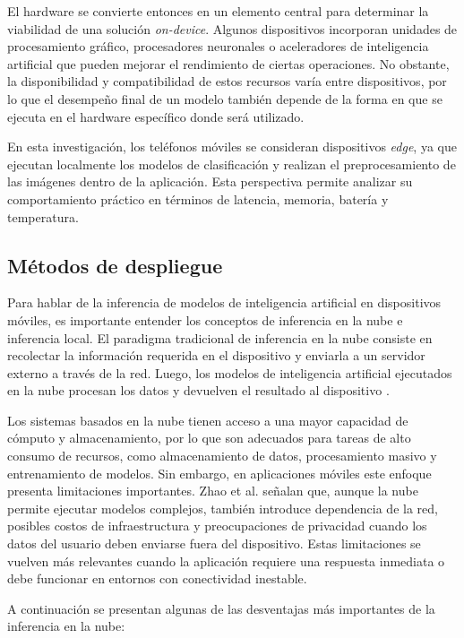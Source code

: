 El hardware se convierte entonces en un elemento central para determinar la viabilidad de una solución \textit{on-device}. Algunos
dispositivos incorporan unidades de procesamiento gráfico, procesadores neuronales o aceleradores de inteligencia artificial que pueden
mejorar el rendimiento de ciertas operaciones. No obstante, la disponibilidad y compatibilidad de estos recursos varía entre dispositivos,
por lo que el desempeño final de un modelo también depende de la forma en que se ejecuta en el hardware específico donde será utilizado.

En esta investigación, los teléfonos móviles se consideran dispositivos \textit{edge}, ya que ejecutan localmente los modelos de
clasificación y realizan el preprocesamiento de las imágenes dentro de la aplicación. Esta perspectiva permite analizar su comportamiento
práctico en términos de latencia, memoria, batería y temperatura.

\subsection{Métodos de despliegue}

Para hablar de la inferencia de modelos de inteligencia artificial en dispositivos móviles, es importante entender los conceptos de
inferencia en la nube e inferencia local. El paradigma tradicional de inferencia en la nube consiste en recolectar la información requerida
en el dispositivo y enviarla a un servidor externo a través de la red. Luego, los modelos de inteligencia artificial ejecutados en la nube
procesan los datos y devuelven el resultado al dispositivo \cite{li2025empirical}.

Los sistemas basados en la nube tienen acceso a una mayor capacidad de cómputo y almacenamiento, por lo que son adecuados para tareas de
alto consumo de recursos, como almacenamiento de datos, procesamiento masivo y entrenamiento de modelos. Sin embargo, en aplicaciones
móviles este enfoque presenta limitaciones importantes. Zhao et al. \cite{zhao2022survey} señalan que, aunque la nube permite ejecutar
modelos complejos, también introduce dependencia de la red, posibles costos de infraestructura y preocupaciones de privacidad cuando los
datos del usuario deben enviarse fuera del dispositivo. Estas limitaciones se vuelven más relevantes cuando la aplicación requiere una
respuesta inmediata o debe funcionar en entornos con conectividad inestable.

A continuación se presentan algunas de las desventajas más importantes de la inferencia en la nube:

